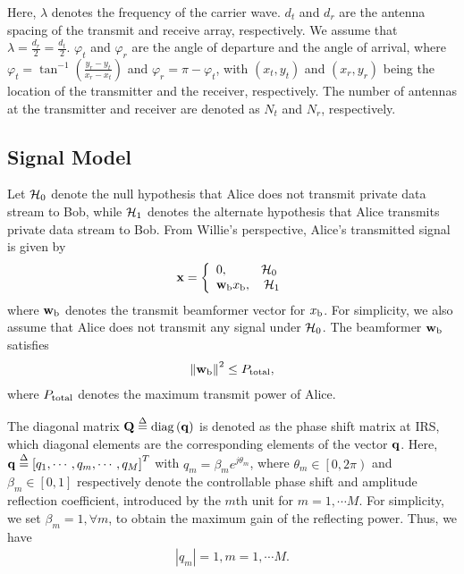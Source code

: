 \documentclass[10pt,journal,letterpaper,twocolumn,twoside]{IEEEtran} %
\begin{document}
Here, $\lambda$ denotes  the frequency of the carrier wave. ${d_t}$ and ${d_r}$ are the antenna spacing of the transmit and receive array, respectively. We assume that $\lambda  = \frac{{{d_r}}}{2} = \frac{{{d_t}}}{2}$. $\varphi _t$ and $\varphi _r$ are the angle of departure and the angle of arrival, where  ${\varphi _t} = {\tan ^{ - 1}}\left( {\frac{{{y_r} - {y_t}}}{{{x_r} - {x_t}}}} \right)$ and ${\varphi _r} = \pi  - {\varphi _t}$, with $\left( {{x_t},{y_t}} \right)$  and $\left( {{x_r},{y_r}} \right)$  being the location of the transmitter and the receiver, respectively.
The number of antennas at the transmitter and receiver are denoted as $N_t$ and $N_r$, respectively.




\subsection{Signal Model}
Let ${{\cal H} _0}$ denote the null hypothesis  that
 Alice does not transmit private  data stream to Bob, while 	${{\cal H} _1}$ denotes the alternate hypothesis that
Alice  transmits private data stream to  Bob\cite{Lehmann_2005_Testing}.
From Willie's perspective, Alice's transmitted signal   is given by
\begin{align}{\bf{x}} = \left\{ \begin{array}{l}
 0,~~~~~~~~{{\cal H} _0} \\
 {{\bf{w}}_{\rm{b}}}{x_{\rm{b}}},~~~{{\cal H} _1} \\
 \end{array} \right.
 \end{align}
where  ${{\bf{w}}_{\rm{b}}}$ denotes the  transmit beamformer vector for  ${{x_{{\rm{b}}}}}$. For simplicity, we also assume that Alice does not transmit any signal under ${{\cal H} _0}$.
The  beamformer  ${{\bf{w}}_{\rm{b}}}$ satisfies
\begin{align}
{\left\| {{{\bf{w}}_{\rm{b}}}} \right\|^2} \le {P_{{\rm{total}}}},
 \end{align}
where ${P_{{\rm{total}}}}$ denotes the    maximum transmit power   of Alice.

The diagonal matrix ${\bf{Q}} \buildrel \Delta \over = {\rm{diag}}\left( {\bf{q}} \right)$ is denoted as the phase shift matrix  at IRS, which diagonal elements are the corresponding elements of the vector ${\bf{q}}$.
Here,  ${\bf{q}} \buildrel \Delta \over = {\left[ {{q_1}, \cdots, {q_m}, \cdots, {q_M}} \right]^T}$ with ${q_m} = {\beta _m}{e^{j{\theta _m}}}$, where ${\theta _m} \in \left[ {0,2\pi } \right)$ and ${\beta _m} \in \left[ {0,1} \right]$ respectively denote the  controllable phase shift and amplitude
reflection coefficient,  introduced by the $m$th unit for $m = 1, \cdots M$.  For simplicity, we set ${\beta _m} = 1,\forall m$, to obtain the maximum gain of the reflecting power. Thus, we have
\begin{align}\label{qn}
\left| {{q_m}} \right| = 1,m = 1, \cdots M.
\end{align}
\end{document}
